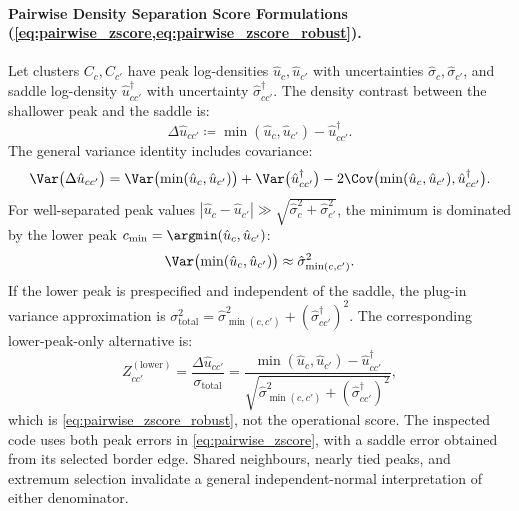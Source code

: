 \paragraph{Pairwise Density Separation Score Formulations
(\cref{eq:pairwise_zscore,eq:pairwise_zscore_robust}).}
Let clusters $C_c, C_{c'}$ have peak log-densities $\hat{u}_c,
\hat{u}_{c'}$ with uncertainties
$\hat{\sigma}_c, \hat{\sigma}_{c'}$, and saddle log-density
$\hat{u}_{cc'}^\dagger$ with uncertainty $\hat{\sigma}_{cc'}^\dagger$.
The density contrast between the shallower peak and the saddle is:
\begin{equation}
  \Delta \hat{u}_{cc'} \coloneqq \min(\hat{u}_c, \hat{u}_{c'}) -
  \hat{u}_{cc'}^\dagger.
\end{equation}
The general variance identity includes covariance:
\begin{equation}
  \Var\bigl(\Delta \hat{u}_{cc'}\bigr) = \Var\bigl(\min(\hat{u}_c,
  \hat{u}_{c'})\bigr) + \Var\bigl(\hat{u}_{cc'}^\dagger\bigr)
  -2\Cov\bigl(\min(\hat u_c,\hat u_{c'}),\hat u_{cc'}^\dagger\bigr).
\end{equation}
For well-separated peak values $|\hat{u}_c - \hat{u}_{c'}| \gg
\sqrt{\hat{\sigma}_c^2 + \hat{\sigma}_{c'}^2}$,
the minimum is dominated by the lower peak $c_{\min} =
\argmin(\hat{u}_c, \hat{u}_{c'})$:
\begin{equation}
  \Var\bigl(\min(\hat{u}_c, \hat{u}_{c'})\bigr) \approx
  \hat{\sigma}_{\min(c, c')}^2.
\end{equation}
If the lower peak is prespecified and independent of the saddle, the
plug-in variance approximation is $\sigma_{\mathrm{total}}^2 =
\hat{\sigma}_{\min(c, c')}^2 + (\hat{\sigma}_{cc'}^\dagger)^2$.
The corresponding lower-peak-only alternative is:
\begin{equation}
  Z_{cc'}^{(\mathrm{lower})} = \frac{\Delta
  \hat{u}_{cc'}}{\sigma_{\mathrm{total}}}
  = \frac{\min(\hat{u}_c, \hat{u}_{c'}) -
  \hat{u}_{cc'}^\dagger}{\sqrt{\hat{\sigma}_{\min(c, c')}^2 +
  (\hat{\sigma}_{cc'}^\dagger)^2}},
\end{equation}
which is \cref{eq:pairwise_zscore_robust}, not the operational score.
The inspected code uses both peak errors in \cref{eq:pairwise_zscore},
with a saddle error obtained from its selected border edge. Shared
neighbours, nearly tied peaks, and extremum selection invalidate a
general independent-normal interpretation of either denominator.

